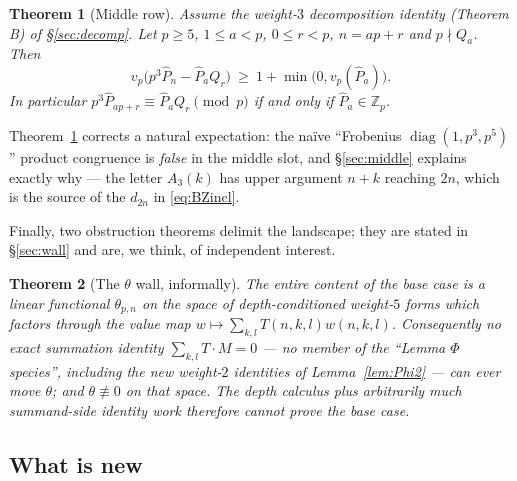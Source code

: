 \documentclass[11pt,reqno]{amsart}
\theoremstyle{plain}
\newtheorem{theorem}{Theorem}[section]
\theoremstyle{definition}
\theoremstyle{remark}
\numberwithin{equation}{section}
\newcommand{\ZZ}{\mathbb{Z}}
\newcommand{\Zp}{\ZZ_p}
\begin{document}
\begin{theorem}[Middle row]\label{thm:Eintro}
Assume the weight-$3$ decomposition identity \textup{(Theorem B)} of \S\ref{sec:decomp}. Let
$p\ge5$, $1\le a<p$, $0\le r<p$, $n=ap+r$ and $p\nmid Q_a$. Then
\[
v_p\bigl(p^3\hat P_n-\hat P_a Q_r\bigr)\ \ge\ 1+\min\bigl(0,v_p(\hat P_a)\bigr).
\]
In particular $p^3\hat P_{ap+r}\equiv \hat P_aQ_r\pmod p$ if and only if $\hat P_a\in\Zp$.
\end{theorem}

Theorem~\ref{thm:Eintro} corrects a natural expectation: the na\"ive ``Frobenius
$\operatorname{diag}(1,p^3,p^5)$'' product congruence is \emph{false} in the middle slot, and
\S\ref{sec:middle} explains exactly why --- the letter $A_3(k)$ has upper argument $n+k$
reaching $2n$, which is the source of the $d_{2n}$ in \eqref{eq:BZincl}.

Finally, two obstruction theorems delimit the landscape; they are stated in
\S\ref{sec:wall} and are, we think, of independent interest.

\begin{theorem}[The $\theta$ wall, informally]\label{thm:wallintro}
The entire content of the base case is a linear functional $\theta_{p,n}$ on the space of
depth-conditioned weight-$5$ forms which \emph{factors through the value map}
$w\mapsto\sum_{k,l}T(n,k,l)w(n,k,l)$. Consequently no exact summation identity
$\sum_{k,l}T\cdot M=0$ --- no member of the ``Lemma $\Phi$ species'', including the new
weight-$2$ identities of Lemma~\textup{\ref{lem:Phi2}} --- can ever move $\theta$; and
$\theta\not\equiv0$ on that space. The depth calculus plus arbitrarily much summand-side
identity work therefore cannot prove the base case.
\end{theorem}

\subsection{What is new}
\end{document}
